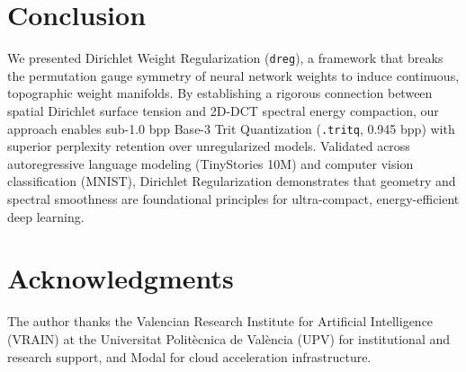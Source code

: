 \documentclass[11pt,a4paper]{article}
\begin{document}
\section{Conclusion}
\label{sec:conclusion}
We presented Dirichlet Weight Regularization (\texttt{dreg}), a framework that breaks the permutation gauge symmetry of neural network weights to induce continuous, topographic weight manifolds. By establishing a rigorous connection between spatial Dirichlet surface tension and 2D-DCT spectral energy compaction, our approach enables sub-1.0 bpp Base-3 Trit Quantization (\texttt{.tritq}, 0.945 bpp) with superior perplexity retention over unregularized models. Validated across autoregressive language modeling (TinyStories 10M) and computer vision classification (MNIST), Dirichlet Regularization demonstrates that geometry and spectral smoothness are foundational principles for ultra-compact, energy-efficient deep learning.

\section*{Acknowledgments}
The author thanks the Valencian Research Institute for Artificial Intelligence (VRAIN) at the Universitat Politècnica de València (UPV) for institutional and research support, and Modal for cloud acceleration infrastructure.

\newpage


\end{document}
